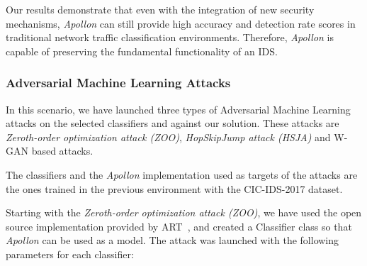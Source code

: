 \begin{table}
    \centering
    \caption{Results of the traditional network traffic and attacks scenario on the CIC-DDoS-2019 dataset.}
    \label{tab:traditional-network-results-2019}
\end{table}

Our results demonstrate that even with the integration of new security mechanisms, \textit{Apollon} can still provide high accuracy
and detection rate scores in traditional network traffic classification environments.
Therefore, \textit{Apollon} is capable of preserving the fundamental functionality of an IDS.

\subsubsection{Adversarial Machine Learning Attacks}
In this scenario, we have launched three types of Adversarial Machine Learning attacks on the selected classifiers and
against our solution.
These attacks are \textit{Zeroth-order optimization attack (ZOO)}, \textit{HopSkipJump attack (HSJA)} and W-GAN based attacks.

The classifiers and the \textit{Apollon} implementation used as targets of the attacks are the ones trained in the previous environment
with the CIC-IDS-2017 dataset.

Starting with the \textit{Zeroth-order optimization attack (ZOO)}, we have used the open source implementation provided by ART~\cite{art2018},
and created a Classifier class so that \textit{Apollon} can be used as a model.
The attack was launched with the following parameters for each classifier:

